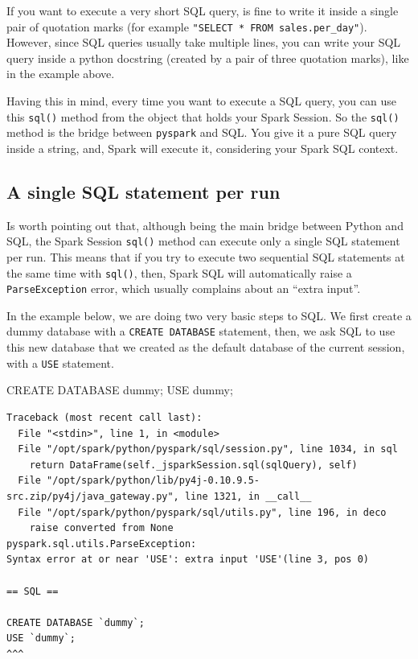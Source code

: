 \documentclass[
  11pt,
  letterpaper,
  DIV=11,
  numbers=noendperiod]{scrreprt}
\newenvironment{Shaded}{\begin{snugshade}}{\end{snugshade}}
\newcommand{\KeywordTok}[1]{\textcolor[rgb]{0.00,0.23,0.31}{#1}}
\newcommand{\NormalTok}[1]{\textcolor[rgb]{0.00,0.23,0.31}{#1}}
\begin{document}
If you want to execute a very short SQL query, is fine to write it
inside a single pair of quotation marks (for example
\texttt{"SELECT\ *\ FROM\ sales.per\_day"}). However, since SQL queries
usually take multiple lines, you can write your SQL query inside a
python docstring (created by a pair of three quotation marks), like in
the example above.

Having this in mind, every time you want to execute a SQL query, you can
use this \texttt{sql()} method from the object that holds your Spark
Session. So the \texttt{sql()} method is the bridge between
\texttt{pyspark} and SQL. You give it a pure SQL query inside a string,
and, Spark will execute it, considering your Spark SQL context.

\hypertarget{a-single-sql-statement-per-run}{%
\subsection{A single SQL statement per
run}\label{a-single-sql-statement-per-run}}

Is worth pointing out that, although being the main bridge between
Python and SQL, the Spark Session \texttt{sql()} method can execute only
a single SQL statement per run. This means that if you try to execute
two sequential SQL statements at the same time with \texttt{sql()},
then, Spark SQL will automatically raise a \texttt{ParseException}
error, which usually complains about an ``extra input''.

In the example below, we are doing two very basic steps to SQL. We first
create a dummy database with a \texttt{CREATE\ DATABASE} statement,
then, we ask SQL to use this new database that we created as the default
database of the current session, with a \texttt{USE} statement.

\begin{Shaded}
\begin{Highlighting}[]
\KeywordTok{CREATE} \KeywordTok{DATABASE}\NormalTok{ \textasciigrave{}dummy\textasciigrave{};}
\KeywordTok{USE}\NormalTok{ \textasciigrave{}dummy\textasciigrave{};}
\end{Highlighting}
\end{Shaded}

\begin{verbatim}
Traceback (most recent call last):
  File "<stdin>", line 1, in <module>
  File "/opt/spark/python/pyspark/sql/session.py", line 1034, in sql
    return DataFrame(self._jsparkSession.sql(sqlQuery), self)
  File "/opt/spark/python/lib/py4j-0.10.9.5-src.zip/py4j/java_gateway.py", line 1321, in __call__
  File "/opt/spark/python/pyspark/sql/utils.py", line 196, in deco
    raise converted from None
pyspark.sql.utils.ParseException: 
Syntax error at or near 'USE': extra input 'USE'(line 3, pos 0)

== SQL ==

CREATE DATABASE `dummy`;
USE `dummy`;
^^^
\end{verbatim}
\end{document}
